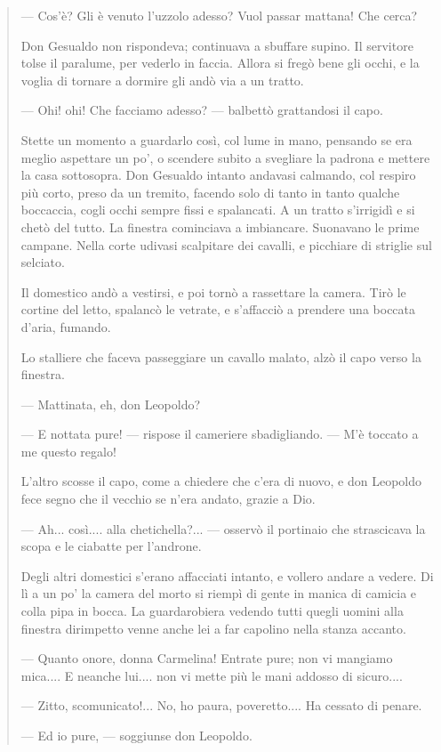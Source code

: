 \documentclass{book}
\begin{document}
\begin{quote}
— Cos’è? Gli è venuto l’uzzolo adesso? Vuol passar mattana! Che cerca?

Don Gesualdo non rispondeva; continuava a sbuffare supino. Il servitore tolse il paralume, per vederlo in faccia. Allora si fregò bene gli occhi, e la voglia di tornare a dormire gli andò via a un tratto.

— Ohi! ohi! Che facciamo adesso? — balbettò grattandosi il capo.

Stette un momento a guardarlo così, col lume in mano, pensando se era meglio aspettare un po’, o scendere subito a svegliare la padrona e mettere la casa sottosopra. Don Gesualdo intanto andavasi calmando, col respiro più corto, preso da un tremito, facendo solo di tanto in tanto qualche boccaccia, cogli occhi sempre fissi e spalancati. A un tratto s’irrigidì e si chetò del tutto. La finestra cominciava a imbiancare. Suonavano le prime campane. Nella corte udivasi scalpitare dei cavalli, e picchiare di striglie sul selciato.

Il domestico andò a vestirsi, e poi tornò a rassettare la camera. Tirò le cortine del letto, spalancò le vetrate, e s’affacciò a prendere una boccata d’aria, fumando.

Lo stalliere che faceva passeggiare un cavallo malato, alzò il capo verso la finestra.

— Mattinata, eh, don Leopoldo?

— E nottata pure! — rispose il cameriere sbadigliando. — M’è toccato a me questo regalo!

L’altro scosse il capo, come a chiedere che c’era di nuovo, e don Leopoldo fece segno che il vecchio se n’era andato, grazie a Dio.

— Ah... così.... alla chetichella?... — osservò il portinaio che strascicava la scopa e le ciabatte per l’androne.

Degli altri domestici s’erano affacciati intanto, e vollero andare a vedere. Di lì a un po’ la camera del morto si riempì di gente in manica di camicia e colla pipa in bocca. La guardarobiera vedendo tutti quegli uomini alla finestra dirimpetto venne anche lei a far capolino nella stanza accanto.

— Quanto onore, donna Carmelina! Entrate pure; non vi mangiamo mica.... E neanche lui.... non vi mette più le mani addosso di sicuro....

— Zitto, scomunicato!... No, ho paura, poveretto.... Ha cessato di penare.

— Ed io pure, — soggiunse don Leopoldo.


\end{quote}
\end{document}
